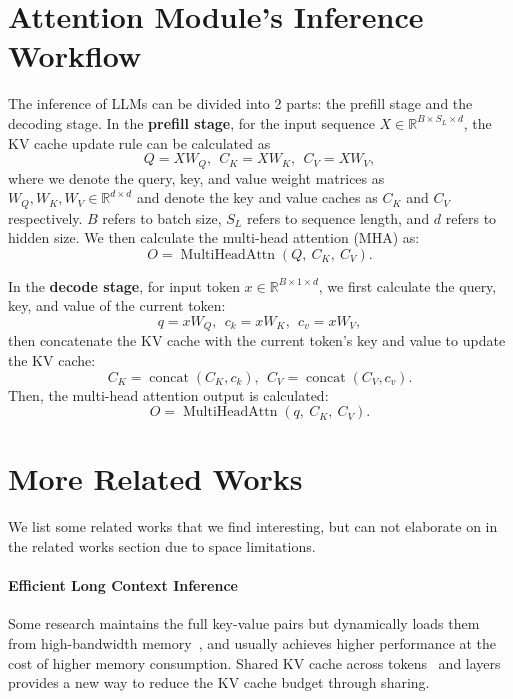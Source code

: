 \appendix
\clearpage
\onecolumn
{}

\section{Attention Module's Inference Workflow}
The inference of LLMs can be divided into 2 parts: the prefill stage and the decoding stage. In the \textbf{prefill stage}, for the input sequence $X\in\mathbb{R}^{B\times S_L\times d}$, the KV cache update rule can be calculated as \[Q = XW_Q, ~~C_K = XW_K, ~~C_V = XW_V,\]
where we denote the query, key, and value weight matrices as $W_Q, W_K, W_V \in \mathbb{R}^{d\times d}$ and denote the key and value caches as $C_K$ and $C_V$ respectively. $B$ refers to batch size, $S_L$ refers to sequence length, and $d$ refers to hidden size. We then calculate the multi-head attention (MHA) as:
\[ O = \operatorname{MultiHeadAttn}(Q,~C_K,~C_V). \]

In the \textbf{decode stage}, for input token $x\in\mathbb{R}^{B\times 1\times d}$, we first calculate the query, key, and value of the current token:
\[q = xW_Q, ~~c_k = xW_K, ~~c_v = xW_V,\]
then concatenate the KV cache with the current token's key and value to update the KV cache:
\[ C_K = \operatorname{concat}(C_K, c_k), ~~C_V = \operatorname{concat}(C_V, c_v).\] 
Then, the multi-head attention output is calculated:
\[ O = \operatorname{MultiHeadAttn}(q,~C_K,~C_V). \]



\section{More Related Works}\label{appendix:rel_works}
We list some related works that we find interesting, but can not elaborate on in the related works section due to space limitations.

\paragraph{Efficient Long Context Inference}
Some research maintains the full key-value pairs but dynamically loads them from high-bandwidth memory~\cite{yang2024doublesparse,tang2024quest}, and usually achieves higher performance at the cost of higher memory consumption. Shared KV cache across tokens~\cite{nawrot2024dynamic} and layers~\cite{brandon2024reducing} provides a new way to reduce the KV cache budget through sharing.

